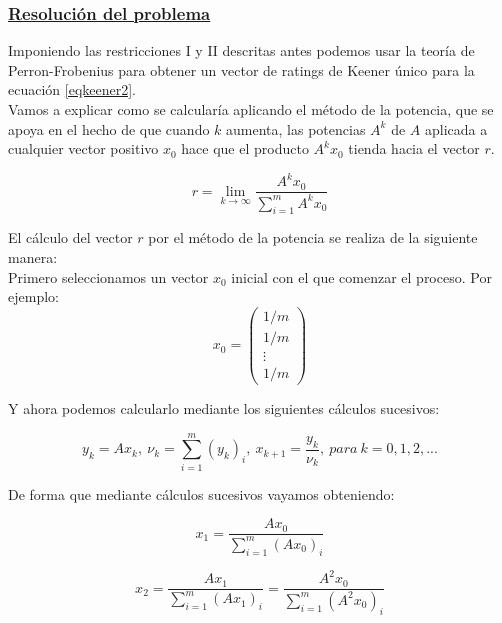\subsubsection*{\underline{Resolución del problema}}
Imponiendo las restricciones I y II descritas antes podemos usar la teoría de Perron-Frobenius \cite[pág 36]{cap4} \cite{perron} para obtener un vector de ratings de Keener único para la ecuación \ref{eqkeener2}.\\

Vamos a explicar como se calcularía aplicando el método de la potencia, que se apoya en el hecho de que cuando $k$ aumenta, las potencias $A^{k}$ de $A$ aplicada a cualquier vector positivo $x_{0}$ hace que el producto $A^{k} x_{0}$ tienda hacia el vector $r$.

\begin{equation}
r = \lim\limits_{k \rightarrow \infty}\dfrac{A^{k} x_{0}}{\sum_{i=1}^{m}A^{k} x_{0}} 
\end{equation}
 
El cálculo del vector $r$ por el método de la potencia se realiza de la siguiente manera:\\

Primero seleccionamos un vector $x_{0}$ inicial con el que comenzar el proceso. Por ejemplo:\\
\begin{equation*}
x_{0} = 
\left( \begin{array}{c}
1/m\\
1/m\\
\vdots\\
1/m
\end{array}\right) 
\end{equation*}
 
Y ahora podemos calcularlo mediante los siguientes cálculos sucesivos:

\begin{equation}
y_{k}=Ax_{k}, \ \nu_{k}=\sum_{i=1}^{m}(y_{k})_{i}, \ x_{k+1}=\dfrac{y_{k}}{\nu_{k}}, \ para \ k = 0,1,2,... \label{powerm}
\end{equation}
 
De forma que mediante cálculos sucesivos vayamos obteniendo:

\begin{equation*}
x_{1}=\dfrac{Ax_{0}}{\sum_{i=1}^{m}(Ax_{0})_{i}}
\end{equation*}

\begin{equation*}
x_{2}=\dfrac{Ax_{1}}{\sum_{i=1}^{m}(Ax_{1})_{i}} = \dfrac{A^{2}x_{0}}{\sum_{i=1}^{m}(A^{2}x_{0})_{i}}
\end{equation*}

